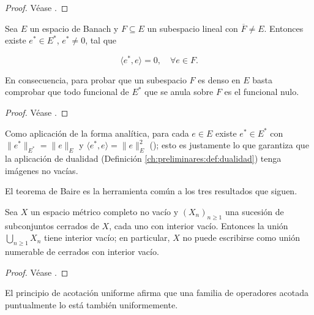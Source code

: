\begin{proof}
Véase \cite[Teorema~1.1]{brezis-2011-fun-ana-sob}.
\end{proof}

\begin{Corolario}
\label{ch:preliminares:cor:hahnBanach}

Sea $E$ un espacio de Banach y $F \subseteq E$ un subespacio lineal con
$\overline{F} \neq E$. Entonces existe $e^* \in E^*$, $e^* \neq 0$, tal que

\[\langle e^*, e \rangle = 0, \quad \forall e \in F.\]

En consecuencia, para probar que un subespacio $F$ es denso en $E$ basta
comprobar que todo funcional de $E^*$ que se anula sobre $F$ es el funcional nulo.
\end{Corolario}

\begin{proof}
Véase \cite[Corolario~1.8]{brezis-2011-fun-ana-sob}.
\end{proof}

\begin{Observacion}
\label{ch:preliminares:obs:hahnBanachDualidad}
Como aplicación de la forma analítica, para cada $e \in E$ existe $e^* \in E^*$
con $\lVert e^* \rVert_{E^*} = \lVert e \rVert_E$ y
$\langle e^*, e \rangle = \lVert e \rVert_E^2$
(\cite[Corolario~1.3]{brezis-2011-fun-ana-sob}); esto es justamente lo que
garantiza que la aplicación de dualidad
(Definición \ref{ch:preliminares:def:dualidad}) tenga imágenes no vacías.
\end{Observacion}

El teorema de Baire es la herramienta común a los tres resultados que siguen.\\

\begin{Teorema}
\label{ch:preliminares:th:baire}

Sea $X$ un espacio métrico completo no vacío y $(X_n)_{n \geq 1}$ una sucesión de
subconjuntos cerrados de $X$, cada uno con interior vacío. Entonces la unión
$\bigcup_{n \geq 1} X_n$ tiene interior vacío; en particular, $X$ no puede
escribirse como unión numerable de cerrados con interior vacío.
\end{Teorema}

\begin{proof}
Véase \cite[Teorema~2.1]{brezis-2011-fun-ana-sob}.
\end{proof}

El principio de acotación uniforme afirma que una familia de operadores acotada
puntualmente lo está también uniformemente.\\

